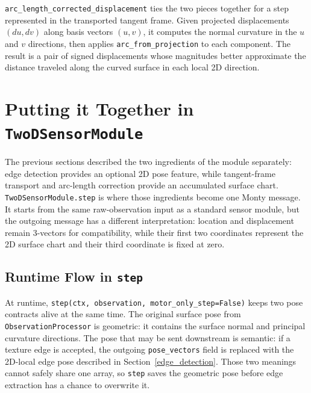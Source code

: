 \documentclass{article}
\begin{document}
\texttt{arc\_length\_corrected\_displacement} ties the two pieces together for a step represented in the transported tangent frame.
Given projected displacements $(du, dv)$ along basis vectors $(u, v)$, it computes the normal curvature in the $u$ and $v$ directions, then applies \texttt{arc\_from\_projection} to each component.
The result is a pair of signed displacements whose magnitudes better approximate the distance traveled along the curved surface in each local 2D direction.

\section{Putting it Together in \texttt{TwoDSensorModule}}

The previous sections described the two ingredients of the module separately: edge detection provides an optional 2D pose feature, while tangent-frame transport and arc-length correction provide an accumulated surface chart.
\texttt{TwoDSensorModule.step} is where those ingredients become one Monty message.
It starts from the same raw-observation input as a standard sensor module, but the outgoing message has a different interpretation: location and displacement remain 3-vectors for compatibility, while their first two coordinates represent the 2D surface chart and their third coordinate is fixed at zero.

\subsection{Runtime Flow in \texttt{step}}

At runtime, \texttt{step(ctx, observation, motor\_only\_step=False)} keeps two pose contracts alive at the same time.
The original surface pose from \texttt{ObservationProcessor} is geometric: it contains the surface normal and principal curvature directions.
The pose that may be sent downstream is semantic: if a texture edge is accepted, the outgoing \texttt{pose\_vectors} field is replaced with the 2D-local edge pose described in Section~\ref{edge_detection}.
Those two meanings cannot safely share one array, so \texttt{step} saves the geometric pose before edge extraction has a chance to overwrite it.
\end{document}
